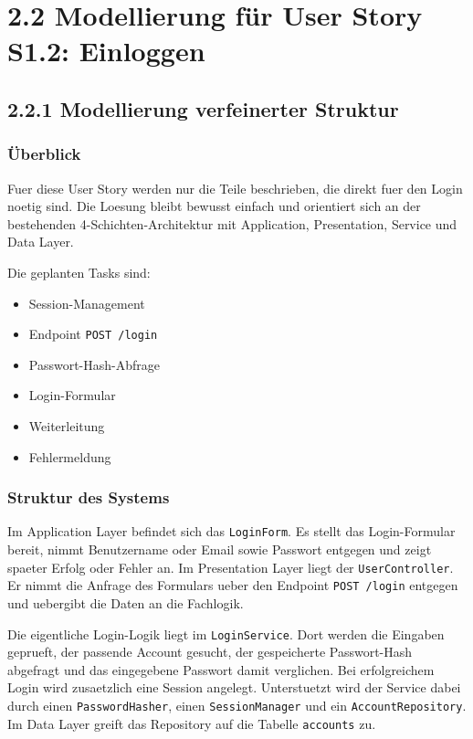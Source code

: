 \documentclass[a4paper,11pt]{article}
\begin{document}
\section*{2.2 Modellierung für User Story S1.2: Einloggen}

\subsection*{2.2.1 Modellierung verfeinerter Struktur}

\subsubsection*{Überblick}

Fuer diese User Story werden nur die Teile beschrieben, die direkt fuer den Login noetig sind. Die Loesung bleibt bewusst einfach und orientiert sich an der bestehenden 4-Schichten-Architektur mit Application, Presentation, Service und Data Layer.

Die geplanten Tasks sind:
\begin{itemize}
	\item Session-Management
	\item Endpoint \texttt{POST /login}
	\item Passwort-Hash-Abfrage
	\item Login-Formular
	\item Weiterleitung
	\item Fehlermeldung
\end{itemize}

\subsubsection*{Struktur des Systems}

Im Application Layer befindet sich das \texttt{LoginForm}. Es stellt das Login-Formular bereit, nimmt Benutzername oder Email sowie Passwort entgegen und zeigt spaeter Erfolg oder Fehler an. Im Presentation Layer liegt der \texttt{UserController}. Er nimmt die Anfrage des Formulars ueber den Endpoint \texttt{POST /login} entgegen und uebergibt die Daten an die Fachlogik.

Die eigentliche Login-Logik liegt im \texttt{LoginService}. Dort werden die Eingaben geprueft, der passende Account gesucht, der gespeicherte Passwort-Hash abgefragt und das eingegebene Passwort damit verglichen. Bei erfolgreichem Login wird zusaetzlich eine Session angelegt. Unterstuetzt wird der Service dabei durch einen \texttt{PasswordHasher}, einen \texttt{SessionManager} und ein \texttt{AccountRepository}. Im Data Layer greift das Repository auf die Tabelle \texttt{accounts} zu.
\end{document}
